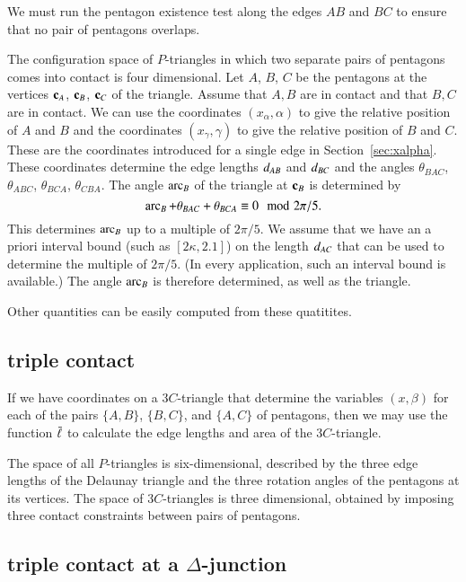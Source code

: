 We must run the pentagon existence test along the edges $AB$ and $BC$ to ensure that no pair
of pentagons overlaps.

The configuration space of $P$-triangles in which two separate pairs of pentagons comes into contact
is four dimensional.  Let $A$, $B$, $C$ be the pentagons at the vertices ${\mathbf c}_A$, ${\mathbf c}_B$, ${\mathbf c}_C$
of the triangle.  Assume that $A,B$ are in contact and that $B,C$ are in contact.
We can use the coordinates $(x_\alpha,\alpha)$ to give the relative position of $A$ and $B$
and the coordinates $(x_\gamma,\gamma)$ to give the relative position of $B$ and $C$.
These are the coordinates introduced for a single edge in Section~\ref{sec:xalpha}.
These coordinates determine the edge lengths $d_{AB}$ and $d_{BC}$ and the angles
$\theta_{BAC}$, $\theta_{ABC}$, $\theta_{BCA}$, $\theta_{CBA}$.
The angle $\operatorname{arc}_B$ of the triangle at ${\mathbf c}_B$ is determined by
\[
\operatorname{arc}_B + \theta_{BAC} + \theta_{BCA} \equiv 0\mod 2\pi/5.
\]
This determines $\operatorname{arc}_B$ up to a multiple of $2\pi/5$.  We assume that we have an a priori
interval bound (such as $[2\kappa,2.1]$) on the length $d_{AC}$ that can be used to determine the multiple of $2\pi/5$.
(In every application, such an interval bound is available.)
The angle $\operatorname{arc}_B$ is therefore determined, as well as the triangle.

Other quantities can be easily computed from these  quatitites.  



\subsection{triple contact}

If we have coordinates on a $3C$-triangle that determine the variables
$(x,\beta)$ for each of the pairs $\{A,B\}$, $\{B,C\}$, and $\{A,C\}$
of pentagons, then we may use the function $\bar\ell$ to calculate the edge
lengths and area of the $3C$-triangle.

The space of all $P$-triangles is six-dimensional, described by the
three edge lengths of the Delaunay triangle and the three rotation
angles of the pentagons at its vertices.  The space of $3C$-triangles
is three dimensional, obtained by imposing three contact constraints
between pairs of pentagons.

\subsection{triple contact at a $\Delta$-junction}

